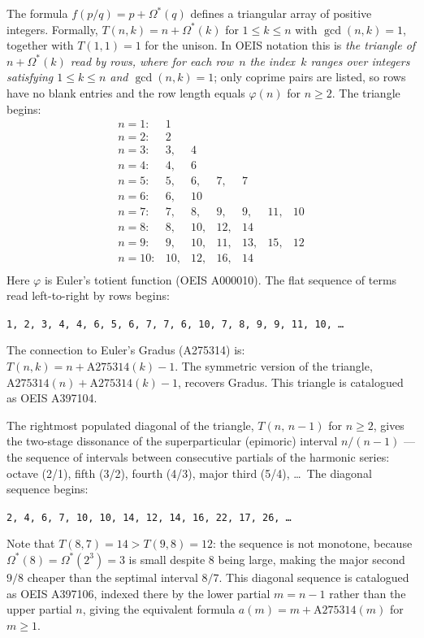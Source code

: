 \documentclass[11pt,a4paper]{article}
\newcommand{\Os}{\Omega^{\!*}}
\begin{document}
The formula $f(p/q) = p + \Os(q)$ defines a triangular array of positive
integers. Formally, $T(n,k) = n + \Os(k)$ for $1 \leq k \leq n$ with
$\gcd(n,k) = 1$, together with $T(1,1) = 1$ for the unison. In OEIS
notation this is \emph{the triangle of $n + \Os(k)$ read by rows, where for
each row~$n$ the index~$k$ ranges over integers satisfying $1 \leq k \leq n$
and $\gcd(n,k) = 1$}; only coprime pairs are listed, so rows have no blank
entries and the row length equals $\varphi(n)$ for $n \geq 2$.
The triangle begins:
\[
\begin{array}{rllllll}
n=1: & 1 \\
n=2: & 2 \\
n=3: & 3, & 4 \\
n=4: & 4, & 6 \\
n=5: & 5, & 6, & 7, & 7 \\
n=6: & 6, & 10 \\
n=7: & 7, & 8, & 9, & 9, & 11, & 10 \\
n=8: & 8, & 10, & 12, & 14 \\
n=9:  & 9,  & 10, & 11, & 13, & 15, & 12 \\
n=10: & 10, & 12, & 16, & 14 \\
\end{array}
\]
Here $\varphi$ is Euler's totient function (OEIS A000010).
The flat sequence of terms read left-to-right by rows begins:
\begin{center}
\texttt{1, 2, 3, 4, 4, 6, 5, 6, 7, 7, 6, 10, 7, 8, 9, 9, 11, 10, \ldots}
\end{center}
The connection to Euler's Gradus (A275314) is:
$T(n,k) = n + \mathrm{A275314}(k) - 1$.
The symmetric version of the triangle, $\mathrm{A275314}(n) +
\mathrm{A275314}(k) - 1$, recovers Gradus. This triangle is catalogued
as OEIS A397104.

The rightmost populated diagonal of the triangle, $T(n,\,n-1)$ for
$n \geq 2$, gives the two-stage dissonance of the superparticular
(epimoric) interval $n/(n-1)$ --- the sequence of intervals between
consecutive partials of the harmonic series: octave (2/1), fifth (3/2),
fourth (4/3), major third (5/4), \ldots\ The diagonal sequence begins:
\begin{center}
\texttt{2, 4, 6, 7, 10, 10, 14, 12, 14, 16, 22, 17, 26, \ldots}
\end{center}
Note that $T(8,7) = 14 > T(9,8) = 12$: the sequence is not monotone,
because $\Os(8) = \Os(2^3) = 3$ is small despite $8$ being large, making
the major second $9/8$ cheaper than the septimal interval $8/7$.
This diagonal sequence is catalogued as OEIS A397106, indexed there by
the lower partial $m = n-1$ rather than the upper partial $n$, giving
the equivalent formula $a(m) = m + \mathrm{A275314}(m)$ for $m \geq 1$.
\end{document}
